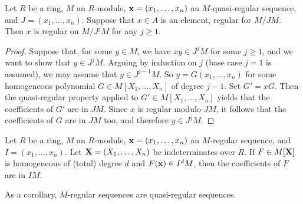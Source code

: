 	\begin{lemma}
		\label{L:lemma in regular -> quasireg}
		Let $R$ be a ring, $M$ an $R$-module, $\mathbf{x} = (x_1, \dots, x_n)$ an $M$-quasi-regular sequence, and $J = (x_1, \dots, x_{n})$. Suppose that $x \in A$ is an element, regular for $M/JM$.   Then $x$ is regular on $M/J^jM$ for any $j\geq 1$.
	\end{lemma}
	\begin{proof}
		Suppose that, for some $y \in M$, we have $x y \in J^j M$ for some $j \geq 1$, and we want to show that $y \in J^jM$. Arguing by induction on $j$ (base case $j=1$ is assumed), we may assume that $y \in J^{j-1} M$. So $y = G(x_1, \dots, x_n)$ for some homogeneous polynomial $G \in M[X_1, \dots, X_n]$ of degree $j-1$. Set $G' = x G$. Then the quasi-regular property applied to $G' \in M[X_1, \dots, X_n]$ yields that the coefficients of $G'$ are in $JM$. Since $x$ is regular modulo $JM$, it follows that the coefficients of $G$ are in $JM$ too, and therefore $y \in J^j M$.
	\end{proof}
	
	
	\begin{theorem}
		Let $R$ be a ring, $M$ an $R$-module, $\mathbf{x} = (x_1, \dots, x_n)$ an $M$-regular sequence, and $I = (x_1, \dots, x_n)$. Let $\mathbf{X} = (X_1, \dots, X_n)$ be indeterminates over $R$. If $F \in M[\mathbf{X}]$ is homogeneous of (total) degree $d$ and $F(\mathbf{x}) \in I^{d}M$, then the coefficients of $F$ are in $IM$.
		
		As a corollary, $M$-regular sequences are quasi-regular sequences.
	\end{theorem}
	
	
	
